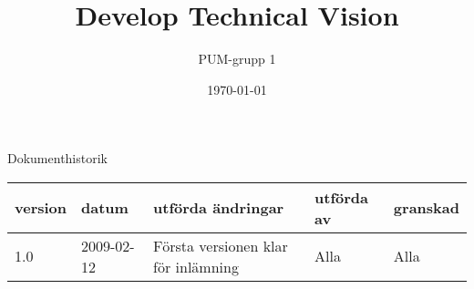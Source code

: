 

\ifpdf
\else
\fi

\title{Develop Technical Vision}
\author{PUM-grupp 1}
\date{\today}



\maketitle\thispagestyle{empty}
\newpage

{\centering \Large{Dokumenthistorik\\}}

\vspace{10pt}
\begin{tabularx}{\textwidth}{ |l|l|X|l|l| }
  \hline
    \textbf{version} & \textbf{datum} & \textbf{utförda ändringar} & \textbf{utförda av} & \textbf{granskad} \\
	\hline 
  1.0 & 2009-02-12 &  Första versionen klar för inlämning  & Alla & Alla   \\
  \hline
\end{tabularx}

\newpage

\setcounter{tocdepth}{2}
\tableofcontents
\newpage

